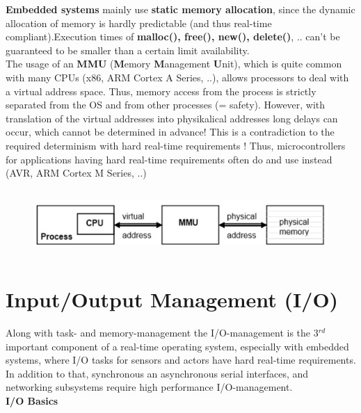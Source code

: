 \textbf{Embedded systems} mainly use \textbf{static memory allocation}, since the dynamic allocation of memory is hardly predictable (and thus real-time compliant).Execution times of \textbf{malloc(), free(), new(), delete()}, .. can't be guaranteed to be smaller than a certain limit  availability.\\

The usage of an \textbf{MMU} (\textbf{M}emory \textbf{M}anagement \textbf{U}nit), which is quite common with many CPUs (x86, ARM Cortex A Series, ..), allows processors to deal with a virtual address space. Thus, memory access from the process is strictly separated from the OS and from other processes (= safety). However, with translation of the virtual addresses into physikalical addresses long delays can occur, which cannot be determined in advance! This is a contradiction to the required determinism with hard real-time requirements ! Thus, microcontrollers for applications having hard real-time requirements often do \textbf{} and use  instead (AVR, ARM Cortex M Series, ..) 

 	\begin{figure}[h]
    \centering
    \includegraphics[width=12cm, height=2.5cm]{Images/image119.png}
    \label{fig:Fig 67}
    \end{figure}
    
\section{Input/Output Management (I/O)}

Along with task- and memory-management the\textbf{ }I/O-management is the 3${}^{rd}$  important component of a real-time operating system, especially with embedded systems, where I/O tasks for sensors and actors have hard real-time requirements.\\

In addition to that, synchronous an asynchronous serial interfaces, and networking subsystems require high performance I/O-management.\\

{\rot\bf I/O Basics}\\

